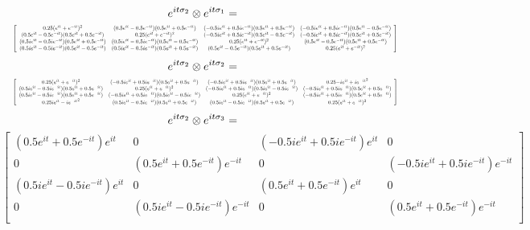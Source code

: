 \documentclass{article}
\begin{document}
\[ e^{it\sigma_2} \otimes e^{it\sigma_1} = \\ \] \[ \resizebox{\textwidth}{!} { $ \left[
    \begin{array}{cccc}
    0.25(e^{it} + e^{-it})^2 & ({0.5e^{it} - 0.5e^{-it}})({0.5e^{it} + 0.5e^{-it}}) & ({-0.5ie^{it} + 0.5ie^{-it}})({0.5e^{it} + 0.5e^{-it}}) & ({-0.5ie^{it} + 0.5ie^{-it}})({0.5e^{it} - 0.5e^{-it}}) \\
    ({0.5e^{it} - 0.5e^{-it}})({0.5e^{it} + 0.5e^{-it}}) & 0.25(e^{it} + e^{-it})^2 & ({-0.5ie^{it} + 0.5ie^{-it}})({0.5e^{it} - 0.5e^{-it}}) & ({-0.5ie^{it} + 0.5ie^{-it}})({0.5e^{it} + 0.5e^{-it}}) \\
    ({0.5ie^{it} - 0.5ie^{-it}})({0.5e^{it} + 0.5e^{-it}}) & ({0.5ie^{it} - 0.5ie^{-it}})({0.5e^{it} - 0.5e^{-it}}) & 0.25(e^{it} + e^{-it})^2 & ({0.5e^{it} - 0.5e^{-it}})({0.5e^{it} + 0.5e^{-it}}) \\
    ({0.5ie^{it} - 0.5ie^{-it}})({0.5e^{it} - 0.5e^{-it}}) & ({0.5ie^{it} - 0.5ie^{-it}})({0.5e^{it} + 0.5e^{-it}}) & ({0.5e^{it} - 0.5e^{-it}})({0.5e^{it} + 0.5e^{-it}}) & 0.25(e^{it} + e^{-it})^2 \\
    \end{array}
    \right] $} \]
\[ e^{it\sigma_2} \otimes e^{it\sigma_2} = \\ \] \[\resizebox{\textwidth}{!} { $ \left[
    \begin{array}{cccc}
    0.25(e^{it} + e^{-it})^2 & ({-0.5ie^{it} + 0.5ie^{-it}})({0.5e^{it} + 0.5e^{-it}}) & ({-0.5ie^{it} + 0.5ie^{-it}})({0.5e^{it} + 0.5e^{-it}}) & 0.25{-ie^{it} + ie^{-it}}^2 \\
    ({0.5ie^{it} - 0.5ie^{-it}})({0.5e^{it} + 0.5e^{-it}}) & 0.25(e^{it} + e^{-it})^2 & ({-0.5ie^{it} + 0.5ie^{-it}})({0.5ie^{it} - 0.5ie^{-it}}) & ({-0.5ie^{it} + 0.5ie^{-it}})({0.5e^{it} + 0.5e^{-it}}) \\
    ({0.5ie^{it} - 0.5ie^{-it}})({0.5e^{it} + 0.5e^{-it}}) & ({-0.5ie^{it} + 0.5ie^{-it}})({0.5ie^{it} - 0.5ie^{-it}}) & 0.25(e^{it} + e^{-it})^2 & ({-0.5ie^{it} + 0.5ie^{-it}})({0.5e^{it} + 0.5e^{-it}}) \\
    0.25{ie^{it} - ie^{-it}}^2 & ({0.5ie^{it} - 0.5ie^{-it}})({0.5e^{it} + 0.5e^{-it}}) & ({0.5ie^{it} - 0.5ie^{-it}})({0.5e^{it} + 0.5e^{-it}}) & 0.25(e^{it} + e^{-it})^2 \\
    \end{array}
    \right] $} \]
\[ e^{it\sigma_2} \otimes e^{it\sigma_3} = \\ \] \[ \left[
    \begin{array}{cccc}
    ({0.5e^{it} + 0.5e^{-it}})e^{it} & 0 & ({-0.5ie^{it} + 0.5ie^{-it}})e^{it} & 0 \\
    0 & ({0.5e^{it} + 0.5e^{-it}})e^{-it} & 0 & ({-0.5ie^{it} + 0.5ie^{-it}})e^{-it} \\
    ({0.5ie^{it} - 0.5ie^{-it}})e^{it} & 0 & ({0.5e^{it} + 0.5e^{-it}})e^{it} & 0 \\
    0 & ({0.5ie^{it} - 0.5ie^{-it}})e^{-it} & 0 & ({0.5e^{it} + 0.5e^{-it}})e^{-it} \\
    \end{array}
    \right]  \]
\end{document}
